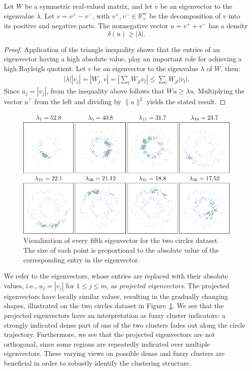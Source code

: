 \begin{observation}\label{thm:project}
Let $W$ be a symmetric real-valued matrix, and let $v$ be an eigenvector to the eigenvalue $\lambda$. Let $v=v^+-v^-$, with $v^+,v^-\in\mathbb{R}^m_+$ be the decomposition of $v$ into its positive and negative parts. The nonnegative vector $u =v^+ + v^-$ has a density 
\[\delta(u) \geq |\lambda|.\]
\end{observation}
\begin{proof}
Application of the triangle inequality shows that the entries of an eigenvector having a high absolute value, play an important role for achieving a high Rayleigh quotient. Let $v$ be an eigenvector to the eigenvalue $\lambda$ of $W$, then:
\begin{align}
|\lambda| |v_j| = \left|W_{j\cdot}v\right| = \left|\sum_{l}W_{jl}v_l\right| \leq 
\sum_{l}W_{jl}|v_l|. \label{eq:absEigen}
\end{align} 
Since $u_j=|v_j|$, from the inequality above follows that $Wu\geq\lambda u$. Multiplying the vector $u^\top$ from the left and dividing by $\|u\|^2$ yields the stated result.
\end{proof}
\begin{figure}[t]\centering
\includegraphics[width=\linewidth]{pics/SAProjEigen.pdf}
%
\caption{Visualization of every fifth eigenvector for the two circles dataset. The size of each point is proportional to the absolute value of the corresponding entry in the eigenvector.}
\label{fig:binaryEmb}
\end{figure}
We refer to the eigenvectors, whose entries are replaced with their absolute values, i.e., $u_j=|v_j|$ for $1\leq j\leq m$, as \emph{projected eigenvectors}. 
The projected eigenvectors have locally similar values, resulting in the gradually changing shapes, illustrated on the two circles dataset in Figure~\ref{fig:binaryEmb}. We see that the projected eigenvectors have an interpretation as fuzzy cluster indicators: a strongly indicated dense part of one of the two clusters fades out along the circle trajectory. Furthermore, we see that the projected eigenvectors are not orthogonal, since some regions are repeatedly indicated over multiple eigenvectors. These varying views on possible dense and fuzzy clusters are beneficial in order to robustly identify the clustering structure.   


